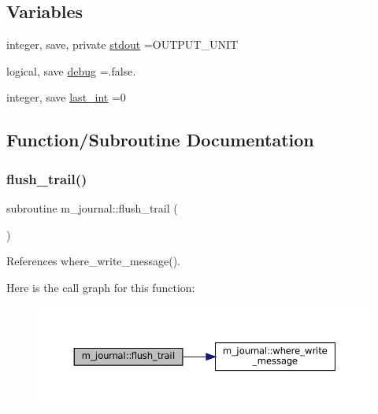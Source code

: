 \subsection*{Variables}
\begin{DoxyCompactItemize}
\item 
integer, save, private \mbox{\hyperlink{namespacem__journal_a664cf3fd85385b776d30ea589606ad1c}{stdout}} =O\+U\+T\+P\+U\+T\+\_\+\+U\+N\+IT
\item 
logical, save \mbox{\hyperlink{namespacem__journal_a6184fbcebdfa06f0a45ce4c699189b53}{debug}} =.false.
\item 
integer, save \mbox{\hyperlink{namespacem__journal_a47e8e34dc4072b04101027394d688519}{last\+\_\+int}} =0
\end{DoxyCompactItemize}


\subsection{Function/\+Subroutine Documentation}
\mbox{\label{namespacem__journal_a24b891eded8ca585a6a72ab0eef7016c}} 
\subsubsection{\texorpdfstring{flush\+\_\+trail()}{flush\_trail()}}
{\footnotesize\ttfamily subroutine m\+\_\+journal\+::flush\+\_\+trail (\begin{DoxyParamCaption}{ }\end{DoxyParamCaption})\hspace{0.3cm}{\ttfamily [private]}}



References where\+\_\+write\+\_\+message().

Here is the call graph for this function\+:\nopagebreak
\begin{figure}[H]
\begin{center}
\leavevmode
\includegraphics[width=350pt]{namespacem__journal_a24b891eded8ca585a6a72ab0eef7016c_cgraph}
\end{center}
\end{figure}
\mbox{\label{namespacem__journal_a1b516ae6ba2da17e10847cf68d6833b1}} 
